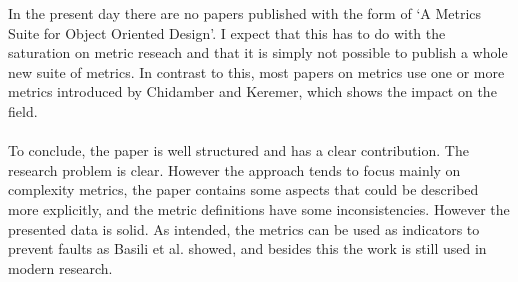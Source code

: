 In the present day there are no papers published with the form of `A Metrics Suite for Object Oriented Design'. I expect that this has
to do with the saturation on metric reseach and that it is simply not possible to publish a whole new suite of metrics.
In contrast to this, most papers on metrics use one or more metrics introduced by Chidamber and Keremer, which shows the
impact on the field.

\paragraph{}
To conclude, the paper is well structured and has a clear contribution. The research problem is clear. However the
approach tends to focus mainly on complexity metrics, the paper contains some aspects that could be described more explicitly,
and the metric definitions have some inconsistencies. However the presented data is solid.
As intended, the metrics can be used as indicators to prevent faults as Basili et al. \autocite{BASILI} showed, and
besides this the work is still used in modern research.
